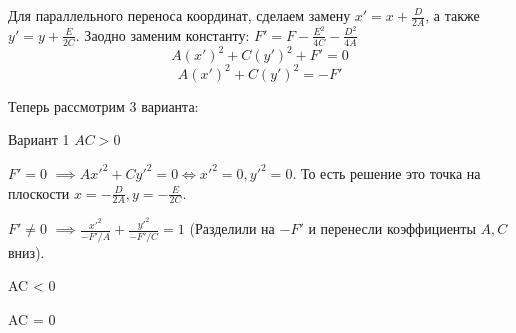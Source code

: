 \documentclass[a4paper,12pt]{article}
\newenvironment{my_enumerate}{
\begin{enumerate}
  \setlength{\itemsep}{1pt}
  \setlength{\parskip}{0pt}
  \setlength{\parsep}{0pt}}{\end{enumerate}
}
\begin{document}
Для параллельного переноса координат, сделаем замену 
$x' = x + \frac{D}{2A}$, а также 
$y' = y + \frac{E}{2C}$. 
Заодно заменим константу:
$F' = F - \frac{E^2}{4C}  - \frac{D^2}{4A}$
\[
A(x')^2 + C(y')^2 + F' = 0
\]
\[
A(x')^2 + C(y')^2 = - F'
\]

Теперь рассмотрим 3 варианта:
\begin{my_enumerate}
\item[Вариант 1] $AC > 0$
\begin{my_enumerate}
\item[$F' = 0$]  $ \implies Ax'^2 + Cy'^2 = 0 \iff x'^2 = 0, y'^2 = 0$. То есть решение это точка на плоскости $x = - \frac{D}{2A}, y = - \frac{E}{2C}$.
\item[$F' \neq 0$] $ \implies \frac{x'^2}{-F' / A} +  \frac{y'^2}{-F' / C} = 1$ (Разделили на $ - F'$ и перенесли коэффициенты $A, C$ вниз).




\end{my_enumerate}

\item[AC < 0]

\item[AC = 0]

\end{my_enumerate}

\newpage
\printindex
\end{document}
